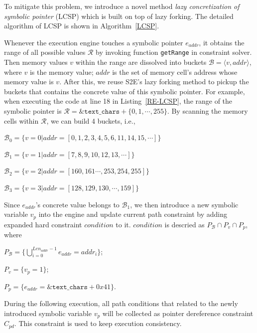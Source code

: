 To mitigate this problem, we introduce a novel method 
\emph{lazy concretization of symbolic pointer} (LCSP) 
which is built on top of lazy forking. The detailed algorithm 
of LCSP is shown in Algorithm~\ref{LCSP}.


 

Whenever the execution engine touches a symbolic pointer $e_{addr}$, it obtains 
the range of all possible values $\mathcal{R}$ by invoking function \texttt{getRange} 
in constraint solver. Then memory values $v$ within the range are dissolved
into buckets $\mathcal{B}=\langle v, addr\rangle$, where $v$ is the memory value; $addr$
is the set of memory cell's address whose memory value is $v$. 
After this, we reuse S2E's lazy forking method to pickup 
the buckets that contains the concrete value of this symbolic pointer.
For example, when executing the code at line 18 in Listing~\ref{RE-LCSP}, the range of 
the symbolic pointer is $\mathcal{R}=\texttt{\&text\_chars}+\{0, 1,\cdots, 255\}$.
By scanning the memory cells within $\mathcal{R}$, we can build 4 buckets, i.e., 

$\mathcal{B}_0=\{v=0| addr=[0,1,2,3,4,5,6,11,14,15,\cdots]\}$

$\mathcal{B}_1=\{v=1| addr=[7,8,9,10,12,13,\cdots]\}$

$\mathcal{B}_2=\{v=2| addr=[160,161\cdots, 253,254,255]\}$

$\mathcal{B}_3=\{v=3| addr=[128,129,130,\cdots,159]\}$

Since $e_{addr}$'s concrete value belongs to $\mathcal{B}_1$, we then
introduce a new symbolic variable $v_p$ into the engine and update current path constraint by adding expanded hard constraint $condition$ to it. 
$condition$ is descried as $P_\mathcal{B}\cap P_v\cap P_p$, where

$P_\mathcal{B}=\{\bigcup\limits_{i=0}^{Len_{addr}-1}e_{addr}=addr_i\}$;

$P_v=\{v_p=1\}$; 

$P_p=\{e_{addr}=\&\texttt{text\_chars}+0x41\}$.

During the following execution, all path conditions that related to the newly
introduced symbolic variable $v_p$ will be collected as pointer dereference constraint
$C_{pd}$.
This constraint is used to keep execution consistency.

